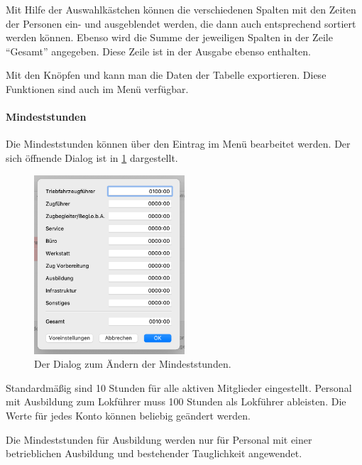Mit Hilfe der Auswahlkästchen können die verschiedenen Spalten mit den Zeiten der Personen ein- und ausgeblendet werden, die dann auch entsprechend sortiert werden können.
Ebenso wird die Summe der jeweiligen Spalten in der Zeile "`Gesamt"' angegeben.
Diese Zeile ist in der Ausgabe ebenso enthalten.


Mit den Knöpfen  und  kann man die Daten der Tabelle exportieren.
Diese Funktionen sind auch im Menü  verfügbar.


\paragraph{Mindeststunden}
Die Mindeststunden können über den Eintrag  im Menü  bearbeitet werden.
Der sich öffnende Dialog ist in \cref{fig:einsatz:personal:mindeststunden} dargestellt.

\begin{figure}[!h]
	\centering
	\includegraphics[width=0.5\textwidth]{img/personal_mindeststunden}
	\caption{Der Dialog zum Ändern der Mindeststunden.}
	\label{fig:einsatz:personal:mindeststunden}
\end{figure}

Standardmäßig sind 10 Stunden für alle aktiven Mitglieder eingestellt.
Personal mit Ausbildung zum Lokführer muss 100 Stunden als Lokführer ableisten.
Die Werte für jedes Konto können beliebig geändert werden.

Die Mindeststunden für Ausbildung werden nur für Personal mit einer betrieblichen Ausbildung und bestehender Tauglichkeit angewendet.




